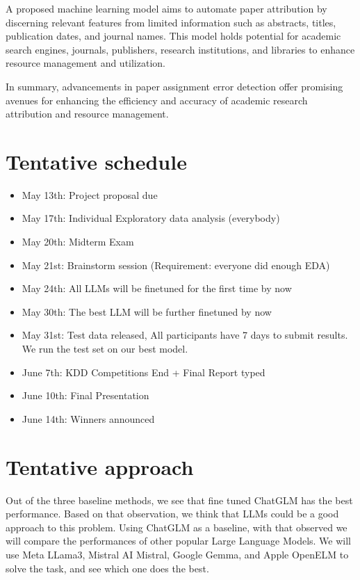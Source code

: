 \documentclass{article}
\begin{document}
A proposed machine learning model aims to automate paper attribution by discerning relevant features from limited information such as abstracts, titles, publication dates, and journal names. This model holds potential for academic search engines, journals, publishers, research institutions, and libraries to enhance resource management and utilization.

In summary, advancements in paper assignment error detection offer promising avenues for enhancing the efficiency and accuracy of academic research attribution and resource management.


\section{Tentative schedule}

\begin{itemize}
    \item May 13th: Project proposal due
    \item May 17th:  Individual Exploratory data analysis (everybody)
    \item May 20th: Midterm Exam
    \item May 21st: Brainstorm session (Requirement: everyone did enough EDA)
    \item May 24th:  All LLMs will be finetuned for the first time by now
    \item May 30th: The best LLM will be further finetuned by now
    \item May 31st: Test data released, All participants have 7 days to submit results. We run the test set on our best model.
    \item June 7th: KDD Competitions End + Final Report typed
    \item June 10th: Final Presentation
    \item June 14th: Winners announced
\end{itemize}

\section{Tentative approach}

Out of the three baseline methods, we see that fine tuned ChatGLM has the best performance. Based on that observation, we think that LLMs could be a good approach to this problem. Using ChatGLM as a baseline, with that observed we will compare the performances of other popular Large Language Models. We will use Meta LLama3, Mistral AI Mistral, Google Gemma, and Apple OpenELM to solve the task, and see which one does the best.
\end{document}
